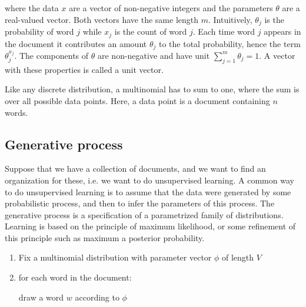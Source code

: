\documentclass[12pt]{report}
\begin{document}
where the data $x$ are a vector of non-negative integers and the parameters $\theta$ are a real-valued vector. Both vectors have the same length $m$. Intuitively, $\theta_j$ is the probability of word $j$ while $x_j$ is the count of word $j$. Each time word $j$ appears in the document it contributes an amount $\theta_j$ to the total probability, hence the term $\theta_j^{x_j}$. The components of $\theta$ are non-negative and have unit $\sum\limits_{j=1}^m \theta_j = 1$. A vector with these properties is called a unit vector.\par

\vspace{3mm}

Like any discrete distribution, a multinomial has to sum to one, where the sum is over all possible data points. Here, a data point is a document containing $n$ words.

\vspace{10mm}


\subsection{Generative process}

\vspace{5mm}

Suppose that we have a collection of documents, and we want to find an organization for these, i.e. we want to do unsupervised learning. A common way to do unsupervised learning is to assume that the data were generated by some probabilistic process, and then to infer the parameters of this process. The generative process is a specification of a parametrized family of distributions. Learning is based on the principle of maximum likelihood, or some refinement of this principle such as maximum a posterior probability.\par

\vspace{3mm}

\begin{enumerate}
  \item Fix a multinomial distribution with parameter vector $\phi$ of length $V$
  \item for each word in the document:
  \begin{itemize}
  draw a word $w$ according to $\phi$
  \end{itemize}
\end{enumerate}

\vspace{3mm}
\end{document}
